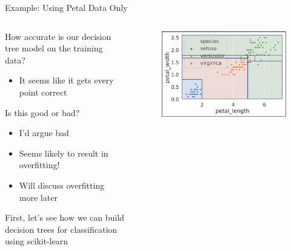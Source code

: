 \documentclass[aspectratio=169]{../latex_main/tntbeamer}  %
\begin{document}
	 
	 \begin{frame}{Example: Using Petal Data Only}
	   \begin{columns}
	        \begin{column}{.5\textwidth}
	               How accurate is our decision tree model on the training data?\\
	               \begin{itemize}
	                   \item It seems like it gets every point correct
	               \end{itemize}
	               \bigskip
	                Is this good or bad?
	                \begin{itemize}
	                    \item I’d argue bad
	                    \item Seems likely to result in overfitting!
	                    \item Will discuss overfitting more later
	                \end{itemize}
	                First, let’s see how we can build decision trees for classification using scikit-learn
	        \end{column}
	   
	   
	         \begin{column}{.5\textwidth}
	               \begin{figure}
	                     \includegraphics[scale=.34]{Bild16}
	                \end{figure}
	        \end{column}
	   \end{columns}
	 \end{frame}
\end{document}

